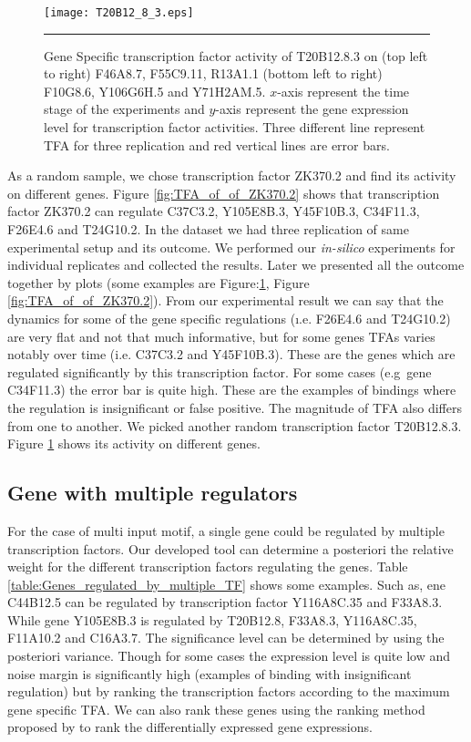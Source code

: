 \begin{figure}
	\centering
		\texttt{[image: T20B12\_8\_3.eps]}
		\rule{35em}{0.5pt}
	\caption[Gene Specific transcription factor activity of T20B12.8.3]
		{Gene Specific transcription factor activity of T20B12.8.3 on (top left to right) F46A8.7, F55C9.11, R13A1.1 (bottom left to right) F10G8.6, Y106G6H.5 and Y71H2AM.5. $x$-axis represent the time stage of the experiments and $y$-axis represent the gene expression level for transcription factor activities. Three different line represent TFA for three replication and red vertical lines are error bars.}
	\label{fig:TFA_of_of_T20B12_8_3}
\end{figure}

As a random sample, we chose transcription factor ZK370.2 and find its activity on different genes. Figure \ref{fig:TFA_of_of_ZK370.2} shows that transcription factor ZK370.2 can regulate C37C3.2, Y105E8B.3, Y45F10B.3, C34F11.3, F26E4.6 and T24G10.2. In the dataset we had three replication of same experimental setup and its outcome. We performed our \textit{in-silico} experiments for individual replicates and collected the results. Later we presented all the outcome together by plots (some examples are Figure:\ref{fig:TFA_of_of_T20B12_8_3}, Figure \ref{fig:TFA_of_of_ZK370.2}). From our experimental result we can say that the dynamics for some of the gene specific regulations (\i.e. F26E4.6 and T24G10.2) are very flat and not that much informative, but for some genes TFAs varies notably over time (i.e. C37C3.2 and Y45F10B.3). These are the genes which are regulated significantly by this transcription factor. For some cases (e.g\ gene C34F11.3) the error bar is quite high. These are the examples of bindings where the regulation is insignificant or false positive. The magnitude of TFA also differs from one to another. We picked another random transcription factor T20B12.8.3. Figure \ref{fig:TFA_of_of_T20B12_8_3} shows its activity on different genes.

\subsection{Gene with multiple regulators}
For the case of multi input motif, a single gene could be regulated by multiple transcription factors. Our developed tool can determine a posteriori the relative weight for the different transcription factors regulating the genes. Table \ref{table:Genes_regulated_by_multiple_TF} shows some examples. Such as, ene C44B12.5 can be regulated by transcription factor Y116A8C.35 and F33A8.3. While gene Y105E8B.3 is regulated by T20B12.8, F33A8.3, Y116A8C.35, F11A10.2 and C16A3.7. The significance level can be determined by using the posteriori variance. Though for some cases the expression level is quite low and noise margin is significantly high (examples of binding with insignificant regulation) but by ranking the transcription factors according to the maximum gene specific TFA. We can also rank these genes using the ranking method proposed by \cite{Kalaitzis:2011} to rank the differentially expressed gene expressions.

